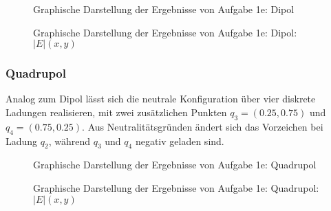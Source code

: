 \begin{landscape}
	\begin{figure}
		\caption{Graphische Darstellung der Ergebnisse von Aufgabe 1e: Dipol}
		\label{fig:edipol}
	\end{figure}
\end{landscape} 


\begin{landscape}
	\begin{figure}
		\caption{Graphische Darstellung der Ergebnisse von Aufgabe 1e: Dipol: $|E|(x,y)$}
		\label{fig:edipolabse}
	\end{figure}
\end{landscape} 

\subsubsection*{Quadrupol}
Analog zum Dipol lässt sich die neutrale Konfiguration über vier diskrete Ladungen realisieren, mit zwei zusätzlichen Punkten $q_3 = (0.25,0.75)$ und $q_4 = (0.75,0.25)$. Aus Neutralitätsgründen ändert sich das Vorzeichen bei Ladung $q_2$, während $q_3$ und $q_4$ negativ geladen sind.

\begin{landscape}
	\begin{figure}
		\caption{Graphische Darstellung der Ergebnisse von Aufgabe 1e: Quadrupol}
		\label{fig:equad}
	\end{figure}
\end{landscape} 


\begin{landscape}
	\begin{figure}
		\caption{Graphische Darstellung der Ergebnisse von Aufgabe 1e: Quadrupol: $|E|(x,y)$}
		\label{fig:equadabse}
	\end{figure}
\end{landscape} 



